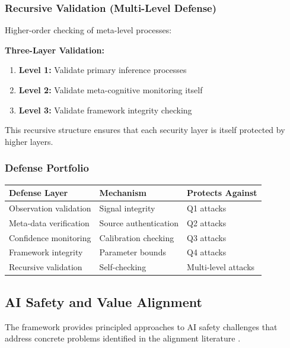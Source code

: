 \documentclass[
]{article}
\newcounter{none} %
\providecommand{\tightlist}{%
  \setlength{\itemsep}{0pt}\setlength{\parskip}{0pt}}
\begin{document}
\subsubsection{Recursive Validation (Multi-Level
Defense)}\label{recursive-validation-multi-level-defense}

Higher-order checking of meta-level processes:

\textbf{Three-Layer Validation:}

\begin{enumerate}
\def\labelenumi{\arabic{enumi}.}
\tightlist
\item
  \textbf{Level 1:} Validate primary inference processes
\item
  \textbf{Level 2:} Validate meta-cognitive monitoring itself
\item
  \textbf{Level 3:} Validate framework integrity checking
\end{enumerate}

This recursive structure ensures that each security layer is itself
protected by higher layers.

\subsubsection{Defense Portfolio}\label{defense-portfolio}

{\def\LTcaptype{none} %
\begin{longtable}[]{@{}lll@{}}
\toprule\noalign{}
Defense Layer & Mechanism & Protects Against \\
\midrule\noalign{}
\endhead
\bottomrule\noalign{}
\endlastfoot
Observation validation & Signal integrity & Q1 attacks \\
Meta-data verification & Source authentication & Q2 attacks \\
Confidence monitoring & Calibration checking & Q3 attacks \\
Framework integrity & Parameter bounds & Q4 attacks \\
Recursive validation & Self-checking & Multi-level attacks \\
\end{longtable}
}

\subsection{AI Safety and Value Alignment}\label{sec:ai_safety}

The framework provides principled approaches to AI safety challenges
that address concrete problems identified in the alignment literature
\citep{amodei2016concrete, russell2019human, gabriel2020artificial}.
\end{document}
